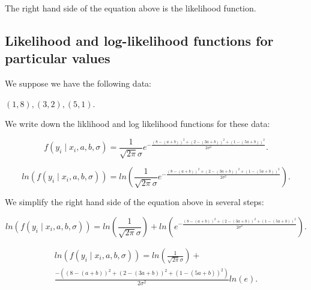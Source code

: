 \documentclass[a5paper,11pt]{article}
\begin{document}
The right hand side of the equation above is the likelihood function.

\subsection{Likelihood and log-likelihood functions for particular values}

We suppose we have the following data:

$\left(1,8\right), \left(3,2\right), \left(5,1\right)$.

We write down the liklihood and log likelihood functions for these
data:

\begin{equation}
f\left(y_i \mid x_i, a, b, \sigma\right)
 =  \frac{1}{\sqrt{2\pi}\sigma}
	e^{-
		\frac{
			\left( 8 -\left(a +b\right)\right)^2
			+ \left( 2 -\left(3a +b\right)\right)^2
			+ \left( 1 -\left(5a +b\right)\right)^2
		  }
		{2\sigma^2}
	  }.
\end{equation}


\begin{equation}
ln \left( f\left(y_i \mid x_i, a, b, \sigma\right) \right)
 =  ln \left( \frac{1}{\sqrt{2\pi}\sigma}
	e^{-
		\frac{
			\left( 8 -\left(a +b\right)\right)^2
			+ \left( 2 -\left(3a +b\right)\right)^2
			+ \left( 1 -\left(5a +b\right)\right)^2
		  }
		{2\sigma^2}
	  } \right).
\end{equation}

We simplify the right hand side of the equation above in several steps:

\begin{equation}
ln \left( f\left(y_i \mid x_i, a, b, \sigma\right) \right)
 =  ln \left( \frac{1}{\sqrt{2\pi}\sigma} \right) + 
	ln \left( e^{-
		\frac{
			\left( 8 -\left(a +b\right)\right)^2
			+ \left( 2 -\left(3a +b\right)\right)^2
			+ \left( 1 -\left(5a +b\right)\right)^2
		  }
		{2\sigma^2}
	  } \right).
\end{equation}


\begin{equation}
\begin{aligned}
ln \left( f\left(y_i \mid x_i, a, b, \sigma\right) \right)
 =  ln \left( \frac{1}{\sqrt{2\pi}\sigma} \right) + \\
	\frac{
			-\left( \left( 8 -\left(a +b\right)\right)^2
			+ \left( 2 -\left(3a +b\right)\right)^2
			+ \left( 1 -\left(5a +b\right)\right)^2
		  \right)}
		{2\sigma^2}	 
	 ln \left( e \right).
\end{aligned}
\end{equation}
\end{document}
